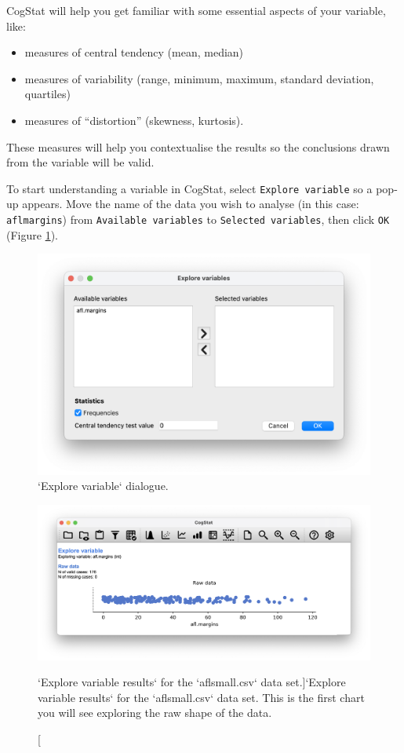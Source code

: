 \documentclass[
  11pt,
]{book}
\providecommand{\tightlist}{%
  \setlength{\itemsep}{0pt}\setlength{\parskip}{0pt}}
\theoremstyle{definition}
\theoremstyle{definition}
\theoremstyle{definition}
\theoremstyle{definition}
\theoremstyle{remark}
\begin{document}
CogStat will help you get familiar with some essential aspects of your variable, like:

\begin{itemize}
\tightlist
\item
  measures of central tendency (mean, median)
\item
  measures of variability (range, minimum, maximum, standard deviation, quartiles)
\item
  measures of ``distortion'' (skewness, kurtosis).
\end{itemize}

These measures will help you contextualise the results so the conclusions drawn from the variable will be valid.

To start understanding a variable in CogStat, select \texttt{Explore\ variable} so a pop-up appears. Move the name of the data you wish to analyse (in this case: \texttt{aflmargins}) from \texttt{Available\ variables} to \texttt{Selected\ variables}, then click \texttt{OK} (Figure \ref{fig:explorevariabledialog}).

\begin{figure}

{\centering \includegraphics[width=0.66\linewidth]{resources/image/explorevariable} 

}

\caption{`Explore variable` dialogue.}\label{fig:explorevariabledialog}
\end{figure}

\begin{figure}

{\centering \includegraphics[width=0.66\linewidth]{resources/image/cogstatrawaflsmall} 

}

\caption[`Explore variable results` for the `aflsmall.csv` data set.]{`Explore variable results` for the `aflsmall.csv` data set. This is the first chart you will see exploring the raw shape of the data.}\label{fig:rawaflsmall}
\end{figure}
\end{document}

